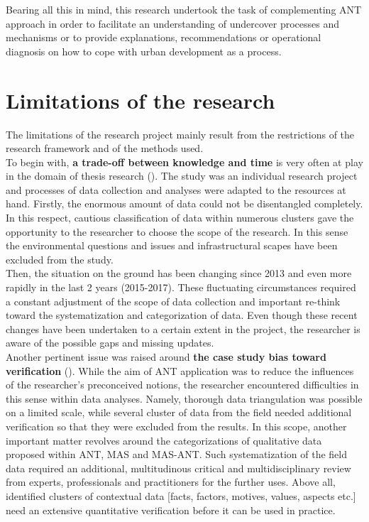 \documentclass[11pt]{report}
\begin{document}
{Bearing all this in mind, this research undertook the task of complementing ANT approach in order to facilitate an understanding of undercover processes and mechanisms or to provide explanations, recommendations or operational diagnosis on how to cope with urban development as a process.

\section{Limitations of the research}

The limitations of the research project mainly result from the restrictions of the research framework and of the methods used.
\\

To begin with, \textbf{a trade-off between knowledge and time} is very often at play in the domain of thesis research (\href{Harrison}{\citealt{Harrison 2002}}).
The study was an individual research project and processes of data collection and analyses were adapted to the resources at hand.
Firstly, the enormous amount of data could not be disentangled completely. In this respect, cautious classification of data within numerous clusters gave the opportunity to the researcher to choose the scope of the research.
In this sense the environmental questions and issues and infrastructural scapes have been excluded from the study.
\\

Then, the situation on the ground has been changing since 2013 and even more rapidly in the last 2 years (2015-2017).
These fluctuating circumstances required a constant adjustment of the scope of data collection and important re-think toward the systematization and categorization of data.
Even though these recent changes have been undertaken to a certain extent in the project, the researcher is aware of the possible gaps and missing updates.
\\

Another pertinent issue was raised around \textbf{the case study bias toward verification} (\href{ref}{\citealt{flyvbjerg_five_2006}}).
While the aim of ANT application was to reduce the influences of the researcher's preconceived notions, the researcher encountered difficulties in this sense within data analyses.
Namely, thorough data triangulation was possible on a limited scale, while several cluster of data from the field needed additional verification so that they were excluded from the results.
In this scope, another important matter revolves around the categorizations of qualitative data proposed within ANT, MAS and MAS-ANT. 
Such systematization of the field data required an additional, multitudinous critical and multidisciplinary review from experts, professionals and practitioners for the further uses.
Above all, identified clusters of contextual data [facts, factors, motives, values, aspects etc.] need an extensive quantitative verification before it can be used in practice.
\\

}
\end{document}
